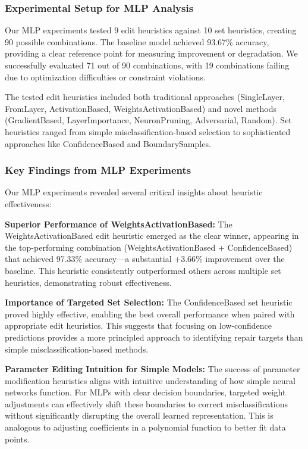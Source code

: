 \documentclass{article}
\begin{document}
\subsubsection{Experimental Setup for MLP Analysis}

Our MLP experiments tested 9 edit heuristics against 10 set heuristics, creating 90 possible combinations. The baseline model achieved 93.67\% accuracy, providing a clear reference point for measuring improvement or degradation. We successfully evaluated 71 out of 90 combinations, with 19 combinations failing due to optimization difficulties or constraint violations.

The tested edit heuristics included both traditional approaches (SingleLayer, FromLayer, ActivationBased, WeightsActivationBased) and novel methods (GradientBased, LayerImportance, NeuronPruning, Adversarial, Random). Set heuristics ranged from simple misclassification-based selection to sophisticated approaches like ConfidenceBased and BoundarySamples.

\subsubsection{Key Findings from MLP Experiments}

Our MLP experiments revealed several critical insights about heuristic effectiveness:

\textbf{Superior Performance of WeightsActivationBased:} The WeightsActivationBased edit heuristic emerged as the clear winner, appearing in the top-performing combination (WeightsActivationBased + ConfidenceBased) that achieved 97.33\% accuracy—a substantial +3.66\% improvement over the baseline. This heuristic consistently outperformed others across multiple set heuristics, demonstrating robust effectiveness.

\textbf{Importance of Targeted Set Selection:} The ConfidenceBased set heuristic proved highly effective, enabling the best overall performance when paired with appropriate edit heuristics. This suggests that focusing on low-confidence predictions provides a more principled approach to identifying repair targets than simple misclassification-based methods.

\textbf{Parameter Editing Intuition for Simple Models:} The success of parameter modification heuristics aligns with intuitive understanding of how simple neural networks function. For MLPs with clear decision boundaries, targeted weight adjustments can effectively shift these boundaries to correct misclassifications without significantly disrupting the overall learned representation. This is analogous to adjusting coefficients in a polynomial function to better fit data points.
\end{document}
